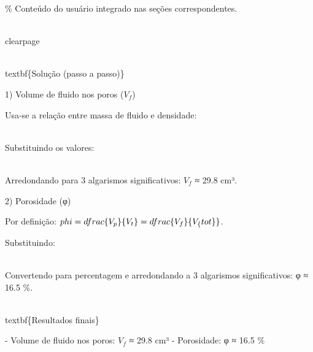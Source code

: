 \documentclass[11pt,a4paper]{article}
\begin{document}
\begin{enumerate}
{\% Conteúdo do usuário integrado nas seções correspondentes.

\\clearpage

\\textbf\{Solução (passo a passo)\}

1) Volume de fluido nos poros ($V_{f}$)

Usa‑se a relação entre massa de fluido e densidade:

\\[ $V_{f}$ = \\frac\{m_\{sat\} - m_\{dry\}\}\{\\$rho_{o}$\} \\]

Substituindo os valores:

\\[ $V_{f}$ = \\frac\{130\\ \\text\{g\} - 105\\ \\text\{g\}\}\{0.84\\ \\text\{g/cm\}^3\} = \\frac\{25\}\{0.84\} \\approx 29.7619\\ \\text\{cm\}^3 \\]

Arredondando para 3 algarismos significativos: $V_{f}$ ≈ 29.8 cm³.

2) Porosidade (φ)

Por definição: $ \\phi = \\dfrac\{V_p\}\{V_t\} = \\dfrac\{V_f\}\{V_\{tot\}\} $.

Substituindo:

\\[ \\phi = \\dfrac\{29.7619\}\{180\} \\approx 0.1653439 \\approx 0.165 \\]

Convertendo para percentagem e arredondando a 3 algarismos significativos: φ ≈ 16.5 \%.


\\textbf\{Resultados finais\}

- Volume de fluido nos poros: $V_{f}$ ≈ 29.8 cm³
- Porosidade: φ ≈ 16.5 \%

}
\end{enumerate}
\end{document}

